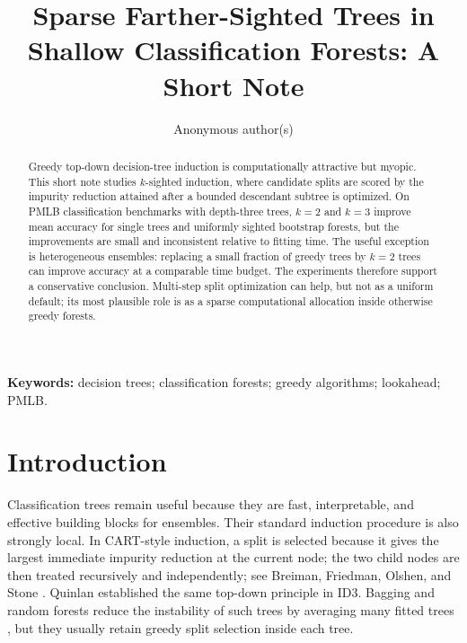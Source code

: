\documentclass[12pt]{article}
\title{Sparse Farther-Sighted Trees in Shallow Classification Forests: A Short Note}
\author{Anonymous author(s)}
\date{}
\begin{document}
\maketitle

\begin{abstract}
Greedy top-down decision-tree induction is computationally attractive but myopic. This short note studies $k$-sighted induction, where candidate splits are scored by the impurity reduction attained after a bounded descendant subtree is optimized. On PMLB classification benchmarks with depth-three trees, $k=2$ and $k=3$ improve mean accuracy for single trees and uniformly sighted bootstrap forests, but the improvements are small and inconsistent relative to fitting time. The useful exception is heterogeneous ensembles: replacing a small fraction of greedy trees by $k=2$ trees can improve accuracy at a comparable time budget. The experiments therefore support a conservative conclusion. Multi-step split optimization can help, but not as a uniform default; its most plausible role is as a sparse computational allocation inside otherwise greedy forests.
\end{abstract}

\noindent\textbf{Keywords:} decision trees; classification forests; greedy algorithms; lookahead; PMLB.

\section{Introduction}

Classification trees remain useful because they are fast, interpretable, and effective building blocks for ensembles. Their standard induction procedure is also strongly local. In CART-style induction, a split is selected because it gives the largest immediate impurity reduction at the current node; the two child nodes are then treated recursively and independently; see Breiman, Friedman, Olshen, and Stone \citeyearpar[Chapter 2]{breiman1984cart}. Quinlan \citeyearpar{quinlan1986induction} established the same top-down principle in ID3. Bagging and random forests reduce the instability of such trees by averaging many fitted trees \citep{breiman1996bagging,breiman2001random}, but they usually retain greedy split selection inside each tree.
\end{document}
